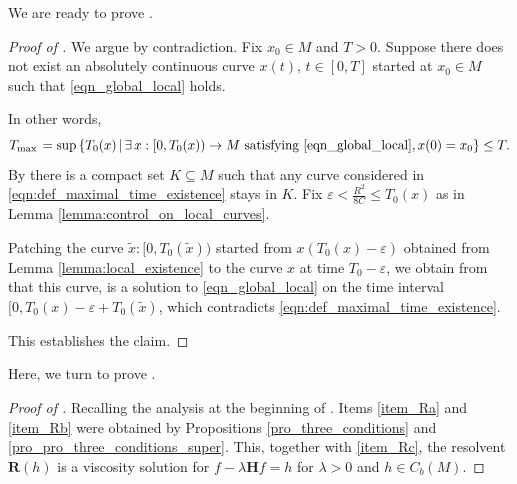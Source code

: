 \documentclass[a4paper]{article}
\numberwithin{equation}{section}
\theoremstyle{definition}
\begin{document}
We are ready to prove .
\begin{proof}[Proof of ]
    We argue by contradiction. Fix $x_0 \in M$ and $T > 0$. Suppose there does not exist an absolutely continuous curve $x(t)$, $t\in [0,T]$ started at $x_0 \in M$ such that \eqref{eqn_global_local} holds.

    In other words,
    \begin{equation} \label{eqn:def_maximal_time_existence}
        T_{\max{}} = \sup\left\{ T_0(x) \, \middle| \, \exists \, x : [0,T_0(x)) \rightarrow M \text{ satisfying }  \eqref{eqn_global_local}, x(0) = x_0 \right\} \leq T.
    \end{equation}
    By  there is a compact set $K \subseteq M$ such that any curve considered in \eqref{eqn:def_maximal_time_existence} stays in $K$. Fix $\varepsilon<\frac{R^2}{8C}\leq T_0(x)$ as in Lemma \ref{lemma:control_on_local_curves}.

    Patching the curve $\tilde{x} : [0,T_0(\tilde{x}))$ started from $x(T_0(x) - \varepsilon)$ obtained from Lemma \ref{lemma:local_existence} to the curve $x$ at time $T_0 - \varepsilon$, we obtain from  that this curve, is a solution to \eqref{eqn_global_local} on the time interval $[0,T_0(x) -\varepsilon + T_0(\tilde{x})$, which contradicts \eqref{eqn:def_maximal_time_existence}.

    This establishes the claim.  
\end{proof}

Here, we turn to prove .

\begin{proof}[Proof of ]
Recalling the analysis at the beginning of . Items \ref{item_Ra} and \ref{item_Rb} were obtained by Propositions \ref{pro_three_conditions} and \ref{pro_pro_three_conditions_super}. This, together with \cref{item_Rc}, the resolvent $\mathbf{R}(h)$ is a viscosity solution for $f-\lambda \mathbf{H}f=h$ for $\lambda>0$ and $h\in C_b(M)$. 
\end{proof}
\end{document}
